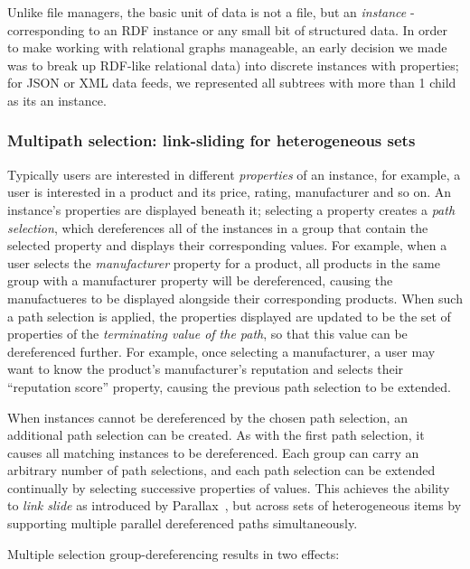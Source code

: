 \documentclass{sigchi}
\begin{document}
Unlike file managers, the basic unit of data is not a file, but an \emph{instance} - corresponding to an RDF instance or any small bit of structured data. In order to make working with relational graphs manageable, an early decision we made was to break up RDF-like relational data) into discrete instances with properties; for JSON or XML data feeds, we represented all subtrees with more than 1 child as its an instance.  

\subsubsection{Multipath selection: link-sliding for heterogeneous sets}

Typically users are interested in different \emph{properties} of an instance, for example, a user is interested in a product and its price, rating, manufacturer and so on.  An instance's properties are displayed beneath it; selecting a property creates a \emph{path selection}, which dereferences all of the instances in a group that contain the selected property and displays their corresponding values.  For example, when a user selects the \emph{manufacturer} property for a product, all products in the same group with a manufacturer property will be dereferenced, causing the manufactueres to be displayed alongside their corresponding products.  When such a path selection is applied, the properties displayed are updated to be the set of properties of the \emph{terminating value of the path}, so that this value can be dereferenced further.  For example, once selecting a manufacturer, a user may want to know the product's manufacturer's reputation and selects their ``reputation score'' property, causing the previous path selection to be extended.

When instances cannot be dereferenced by the chosen path selection, an additional path selection can be created. As with the first path selection, it causes all matching instances to be dereferenced.  Each group can carry an arbitrary number of path selections, and each path selection can be extended continually by selecting successive properties of values. This achieves the ability to \emph{link slide} as introduced by Parallax~\cite{parallax}, but across sets of heterogeneous items by supporting multiple parallel dereferenced paths simultaneously.  

Multiple selection group-dereferencing results in two effects: 
\end{document}
